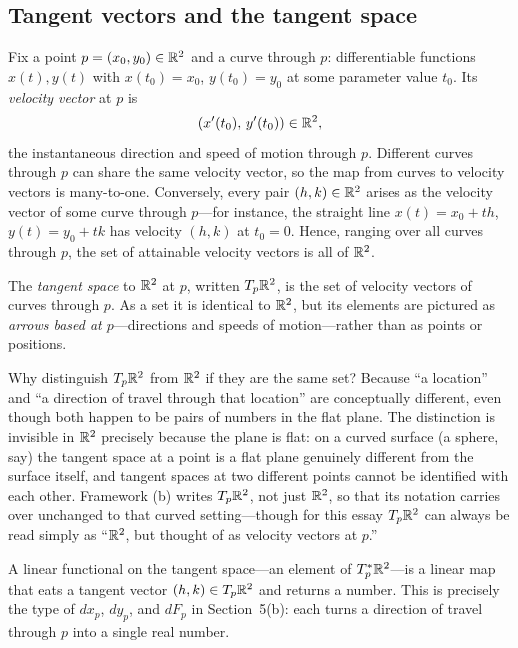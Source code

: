 \documentclass{essay}
\begin{document}
\subsection*{Tangent vectors and the tangent space}

Fix a point \(p=(x_{0},y_{0})\in\mathbb{R}^{2}\) and a curve through \(p\): differentiable functions \(x(t),y(t)\) with \(x(t_{0})=x_{0}\), \(y(t_{0})=y_{0}\) at some parameter value \(t_{0}\). Its \emph{velocity vector} at \(p\) is
\[ (x'(t_{0}),\,y'(t_{0})) \in \mathbb{R}^{2}, \]
the instantaneous direction and speed of motion through \(p\). Different curves through \(p\) can share the same velocity vector, so the map from curves to velocity vectors is many-to-one. Conversely, every pair \((h,k)\in\mathbb{R}^{2}\) arises as the velocity vector of some curve through \(p\)---for instance, the straight line \(x(t)=x_{0}+th\), \(y(t)=y_{0}+tk\) has velocity \((h,k)\) at \(t_{0}=0\). Hence, ranging over all curves through \(p\), the set of attainable velocity vectors is all of \(\mathbb{R}^{2}\).

\begin{definition}
  The \emph{tangent space} to \(\mathbb{R}^{2}\) at \(p\), written \(T_{p}\mathbb{R}^{2}\), is the set of velocity vectors of curves through \(p\). As a set it is identical to \(\mathbb{R}^{2}\), but its elements are pictured as \emph{arrows based at \(p\)}---directions and speeds of motion---rather than as points or positions.
\end{definition}

Why distinguish \(T_{p}\mathbb{R}^{2}\) from \(\mathbb{R}^{2}\) if they are the same set? Because ``a location'' and ``a direction of travel through that location'' are conceptually different, even though both happen to be pairs of numbers in the flat plane. The distinction is invisible in \(\mathbb{R}^{2}\) precisely because the plane is flat: on a curved surface (a sphere, say) the tangent space at a point is a flat plane genuinely different from the surface itself, and tangent spaces at two different points cannot be identified with each other. Framework (b) writes \(T_{p}\mathbb{R}^{2}\), not just \(\mathbb{R}^{2}\), so that its notation carries over unchanged to that curved setting---though for this essay \(T_{p}\mathbb{R}^{2}\) can always be read simply as ``\(\mathbb{R}^{2}\), but thought of as velocity vectors at \(p\).''

A linear functional on the tangent space---an element of \(T_{p}^*\mathbb{R}^{2}\)---is a linear map that eats a tangent vector \((h,k)\in T_{p}\mathbb{R}^{2}\) and returns a number. This is precisely the type of \(dx_{p}\), \(dy_{p}\), and \(dF_{p}\) in Section~5(b): each turns a direction of travel through \(p\) into a single real number.
\end{document}
